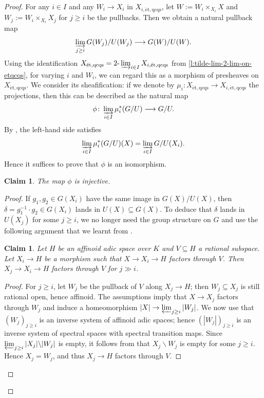\documentclass[11pt]{amsart}
\numberwithin{equation}{section}
\newtheorem{Claim}[thm]{Claim}
\theoremstyle{definition}
\theoremstyle{remark}
\newcommand{\lra}{\longrightarrow}
\newcommand{\etqcqs}{{\operatorname{\acute{e}t,qcqs}}}
\begin{document}
\begin{proof}
	For any $i\in I$ and any $W_i\to X_{i}$ in $X_{i,\etqcqs}$, let $W:=W_i\times_{X_i}X$ and $W_j:=W_i\times_{X_i}X_j$ for $j\geq i$ be the pullbacks. Then we obtain a natural pullback map
	\[\varinjlim_{j\geq i} G(W_j)/U(W_j)\lra G(W)/U(W). \]
	Using the identification
	$ X_{\etqcqs}=2\text{-}\varinjlim_{i\in I}X_{i,\etqcqs}$ from \cref{l:tilde-lim-2-lim-on-etqcqs},  for varying $i$ and $W_i$, we can regard this as a morphism of presheaves on $X_{\etqcqs}$. We consider its sheafification: if we denote by $\mu_i\colon X_{\etqcqs}\to X_{i,\etqcqs}$ the projections, then this can be described as the natural map
	\[\phi\colon \varinjlim_{i\in I}\mu_i^{\ast}(G/U)\lra G/U.\]
	By \cite[Tag~09YN]{StacksProject}, the left-hand side satisfies 
	\[ \varinjlim_{i\in I}\mu_i^{\ast}(G/U)(X)=\varinjlim_{i\in I} G/U(X_i).\]
	Hence it suffices to prove that $\phi$ is an isomorphism.
        
	\begin{Claim}
		The map $\phi$ is injective.
	\end{Claim}

        \begin{proof}
	If $g_1,g_2\in G(X_i)$ have the same image in $G(X)/U(X)$, then $\delta=g_1^{-1}\cdot g_2\in G(X_i)$ lands in $U(X)\subseteq G(X)$. To deduce that $\delta$ lands in $U(X_j)$ for some $j\geq i$, we no longer need the group structure on $G$ and use the following argument that we learnt from \cite[Lemma 6.13(iv)]{perfectoid-spaces}. 

        \begin{Claim}
		Let $H$ be an affinoid adic space over $K$ and $V\subseteq H$ a rational subspace. Let $X_i\to H$ be a morphism such that $X\to X_i\to H$ factors through $V$. Then $X_j\to X_i\to H$ factors through $V$ for $j\gg i$.
	\end{Claim}

        \begin{proof} For $j\geq i$, let $W_j$ be the pullback of $V$ along $X_j\to H$; then $W_j\subseteq X_j$ is still rational open, hence affinoid. The assumptions imply that $X\to X_j$ factors through $W_j$ and induce a homeomorphism $|X|\to \varprojlim_{j\geq i} |W_j|$. We now use that $(W_j)_{j\geq i}$ is an inverse system of affinoid adic spaces; hence $(|W_j|)_{j\geq i}$ is an inverse system of spectral spaces with spectral transition maps. Since $\varprojlim_{j\geq i} |X_j|\backslash |W_j|$ is empty, it follows from \cite[Tag 0A2W]{StacksProject} that $X_j\backslash W_j$ is empty for some $j\geq i$. Hence $X_j=W_j$, and thus $X_j\to H$ factors through $V$. 
	\end{proof}


\end{proof}
\end{proof}
\end{document}
